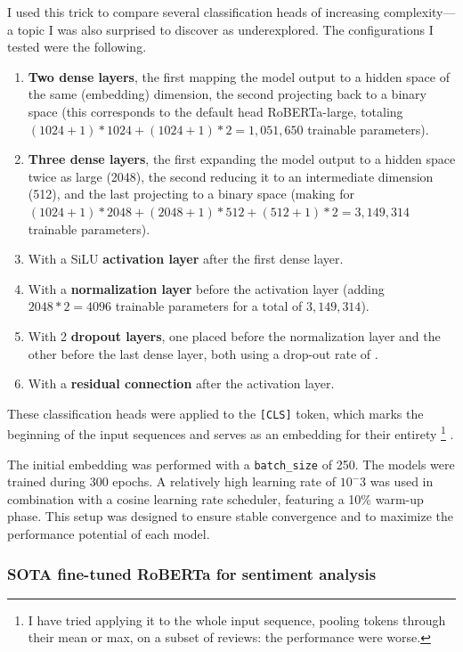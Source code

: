 \documentclass{article}
\begin{document}
I used this trick to compare several classification heads of increasing complexity---a topic I was also surprised to discover as underexplored. The configurations I tested were the following.
\begin{enumerate}
    \item \textbf{Two dense layers}, the first mapping the model output to a hidden space of the same (embedding) dimension, the second projecting back to a binary space (this corresponds to the default head RoBERTa-large, totaling $(1024+1)*1024+(1024+1)*2=1,051,650$ trainable parameters).
    \item \textbf{Three dense layers}, the first expanding the model output to a hidden space twice as large (2048), the second reducing it to an intermediate dimension (512), and the last projecting to a binary space (making for $(1024+1)*2048+(2048+1)*512+(512+1)*2=3,149,314$ trainable parameters).
    \item With a SiLU \textbf{activation layer} after the first dense layer.
    \item With a \textbf{normalization layer} before the activation layer (adding $2048*2=4096$ trainable parameters for a total of $3,149,314$).
    \item With 2 \textbf{dropout layers}, one placed before the normalization layer and the other before the last dense layer, both using a drop-out rate of .
    \item With a \textbf{residual connection} after the activation layer.
\end{enumerate}

These classification heads were applied to the \texttt{[CLS]} token, which marks the beginning of the input sequences and serves as an embedding for their entirety 
\footnote{I have tried applying it to the whole input sequence, pooling tokens through their mean or max, on a subset of reviews: the performance were worse.}
.

The initial embedding was performed with a \texttt{batch\_size} of 250. The models were trained during 300 epochs. A relatively high learning rate of $10^-3$ was used in combination with a cosine learning rate scheduler, featuring a 10\% warm-up phase. This setup was designed to ensure stable convergence and to maximize the performance potential of each model.

\subsubsection{SOTA fine-tuned RoBERTa for sentiment analysis}
\end{document}
